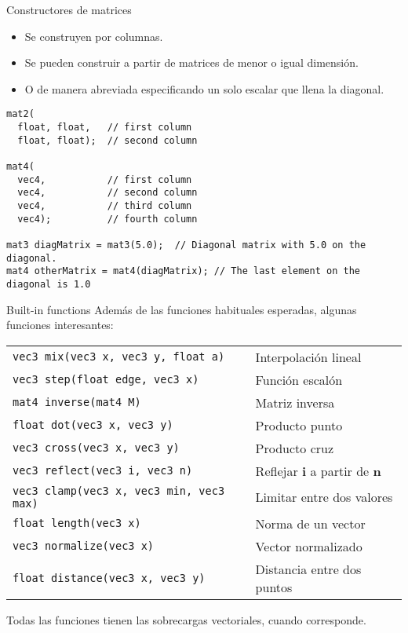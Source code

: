 \begin{frame}[fragile]{Constructores de matrices}
\begin{itemize}
    \item Se construyen por columnas.
    \item Se pueden construir a partir de matrices de menor o igual dimensión.
    \item O de manera abreviada especificando un solo escalar que llena la diagonal.
\end{itemize}
\begin{listing}
\begin{verbatim}
mat2(
  float, float,   // first column
  float, float);  // second column

mat4(
  vec4,           // first column
  vec4,           // second column
  vec4,           // third column
  vec4);          // fourth column

mat3 diagMatrix = mat3(5.0);  // Diagonal matrix with 5.0 on the diagonal.
mat4 otherMatrix = mat4(diagMatrix); // The last element on the diagonal is 1.0
\end{verbatim}
\end{listing}
\end{frame}

\begin{frame}{Built-in functions}
Además de las funciones habituales esperadas, algunas funciones interesantes:
\begin{table}[htb]
  \begin{center}
    \begin{tabular}{l | l }
      \texttt{vec3 mix(vec3 x, vec3 y, float a)} & Interpolación lineal \\
      \texttt{vec3 step(float edge, vec3 x)} & Función escalón \\
      \texttt{mat4 inverse(mat4 M)} & Matriz inversa \\
      \texttt{float dot(vec3 x, vec3 y)} & Producto punto \\
      \texttt{vec3 cross(vec3 x, vec3 y)} & Producto cruz \\
      \texttt{vec3 reflect(vec3 i, vec3 n)} & Reflejar $\mathbf{i}$ a partir de $\mathbf{n}$ \\
      \texttt{vec3 clamp(vec3 x, vec3 min, vec3 max)} & Limitar entre dos valores \\
      \texttt{float length(vec3 x)} & Norma de un vector \\
      \texttt{vec3 normalize(vec3 x)} & Vector normalizado \\
      \texttt{float distance(vec3 x, vec3 y)} & Distancia entre dos puntos \\
    \end{tabular}
  \end{center}
\end{table}
Todas las funciones tienen las sobrecargas vectoriales, cuando corresponde.
\end{frame}

